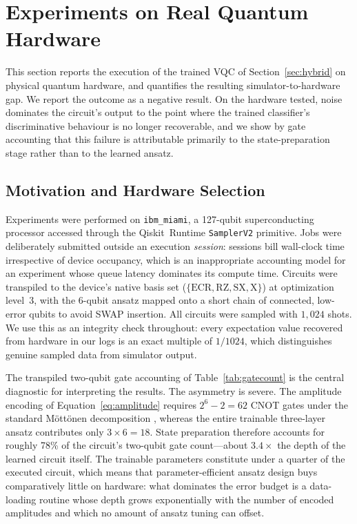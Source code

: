 \documentclass[11pt,a4paper]{article}
\begin{document}
\section{Experiments on Real Quantum Hardware}
\label{sec:hardware}

This section reports the execution of the trained VQC of
Section~\ref{sec:hybrid} on physical quantum hardware, and quantifies the
resulting simulator-to-hardware gap.  We report the outcome as a negative
result.  On the hardware tested, noise dominates the circuit's output to the
point where the trained classifier's discriminative behaviour is no longer
recoverable, and we show by gate accounting that this failure is attributable
primarily to the state-preparation stage rather than to the learned ansatz.

\subsection{Motivation and Hardware Selection}
\label{sec:hw_motivation}

Experiments were performed on \texttt{ibm\_miami}, a 127-qubit
superconducting processor accessed through the Qiskit~Runtime
\texttt{SamplerV2} primitive.  Jobs were deliberately submitted outside an
execution \emph{session}: sessions bill wall-clock time irrespective of device
occupancy, which is an inappropriate accounting model for an experiment whose
queue latency dominates its compute time.  Circuits were transpiled to the
device's native basis set
($\{\mathrm{ECR}, \mathrm{RZ}, \mathrm{SX}, \mathrm{X}\}$) at optimization
level~3, with the 6-qubit ansatz mapped onto a short chain of connected,
low-error qubits to avoid SWAP insertion.  All circuits were sampled with
$1{,}024$ shots.  We use this as an integrity check throughout: every
expectation value recovered from hardware in our logs is an exact multiple of
$1/1024$, which distinguishes genuine sampled data from simulator output.

The transpiled two-qubit gate accounting of Table~\ref{tab:gatecount} is the
central diagnostic for interpreting the results.  The asymmetry is severe.  The
amplitude encoding of Equation~\ref{eq:amplitude} requires $2^6 - 2 = 62$
CNOT gates under the standard M\"ott\"onen decomposition
\cite{mottonen2005}, whereas the entire trainable three-layer ansatz
contributes only $3 \times 6 = 18$.  State preparation therefore accounts for
roughly 78\% of the circuit's two-qubit gate count---about $3.4\times$ the
depth of the learned circuit itself.  The trainable parameters constitute
under a quarter of the executed circuit, which means that parameter-efficient
ansatz design buys comparatively little on hardware: what dominates the error
budget is a data-loading routine whose depth grows exponentially with the
number of encoded amplitudes and which no amount of ansatz tuning can offset.
\end{document}
